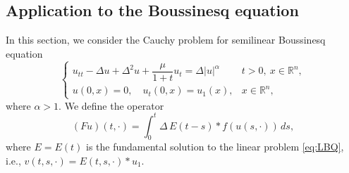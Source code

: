 \documentclass[10pt]{article}
\newcommand{\<}{\langle}
\renewcommand{\>}{\rangle}
\numberwithin{equation}{section}
\newcommand{\R}{{\mathbb{R}}}
\begin{document}
\subsection{Application to the Boussinesq equation}\label{sec:nonlinear}
In this section, we consider the Cauchy problem for semilinear Boussinesq equation
\begin{equation} \label{eq:NBQ}
\begin{cases}
u_{tt}-\Delta u +\Delta^2 u+ \dfrac{\mu}{1+t} u_t =\Delta|u|^\alpha & t>0,\ x\in\R^n,\\
u(0,x)=0, \quad u_t(0,x)=u_1(x), & x\in\R^n,
\end{cases}
\end{equation}
where $\alpha>1$. We define the operator
\[ (Fu)(t,\cdot) =\int_0^t \Delta\, E(t-s)\ast f(u(s,\cdot))\,ds, \]
where $E=E(t)$ is the fundamental solution to the linear problem \eqref{eq:LBQ}, i.e., $v(t,s, \cdot)= E(t,s, \cdot)\ast u_1$.
\end{document}
